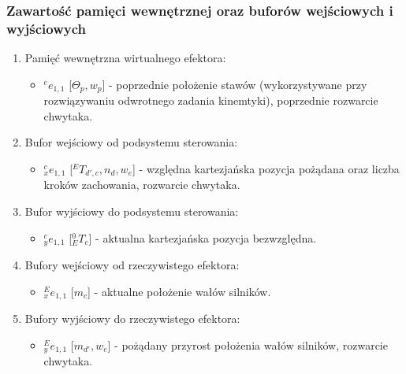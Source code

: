 \documentclass{article}
\begin{document}
\subsubsection{Zawarto\'sć pamięci wewnętrznej oraz buforów wej\'sciowych i wyj\'sciowych}
\begin{enumerate}
\item Pamięć wewnętrzna wirtualnego efektora:
\begin{itemize}
\item  $^ee_{1,1}$ [$\Theta_p, w_p$] - poprzednie położenie stawów (wykorzystywane przy rozwiązywaniu odwrotnego zadania kinemtyki), poprzednie rozwarcie chwytaka.
\end{itemize}
\item Bufor wej\'sciowy od podsystemu sterowania:
\begin{itemize}
\item  $^c_xe_{1,1}$ [$^ET_{d',c}, n_d, w_e$] - względna kartezjańska pozycja pożądana oraz liczba kroków zachowania, rozwarcie chwytaka.
\end{itemize}
\item Bufor wyj\'sciowy do podsystemu sterowania:
\begin{itemize}
\item $^c_ye_{1,1}$ [$^0_ET_c$] - aktualna kartezjańska pozycja bezwzględna.
\end{itemize}
\item Bufory wej\'sciowy od rzeczywistego efektora:
\begin{itemize}
\item $^E_xe_{1,1}$ [$m_c$] - aktualne położenie wałów silników.
\end{itemize}
\item Bufory wyj\'sciowy do rzeczywistego efektora:
\begin{itemize}
\item $^E_ye_{1,1}$ [$m_{d'}, w_e$] - pożądany przyrost położenia wałów silników, rozwarcie chwytaka.
\end{itemize}
\end{enumerate}

\end{document}
